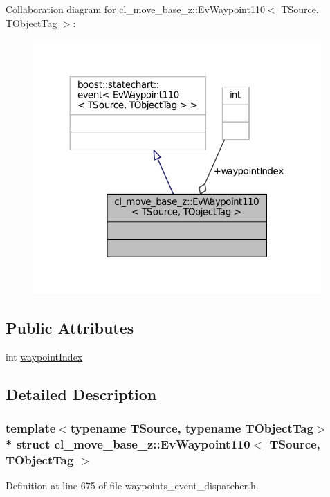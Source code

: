 Collaboration diagram for cl\+\_\+move\+\_\+base\+\_\+z\+:\+:Ev\+Waypoint110$<$ T\+Source, T\+Object\+Tag $>$\+:
\nopagebreak
\begin{figure}[H]
\begin{center}
\leavevmode
\includegraphics[width=312pt]{structcl__move__base__z_1_1EvWaypoint110__coll__graph}
\end{center}
\end{figure}
\subsection*{Public Attributes}
\begin{DoxyCompactItemize}
\item 
int \hyperlink{structcl__move__base__z_1_1EvWaypoint110_aac8582020381badb6b9ca7abbff16f3f}{waypoint\+Index}
\end{DoxyCompactItemize}


\subsection{Detailed Description}
\subsubsection*{template$<$typename T\+Source, typename T\+Object\+Tag$>$\\*
struct cl\+\_\+move\+\_\+base\+\_\+z\+::\+Ev\+Waypoint110$<$ T\+Source, T\+Object\+Tag $>$}



Definition at line 675 of file waypoints\+\_\+event\+\_\+dispatcher.\+h.



